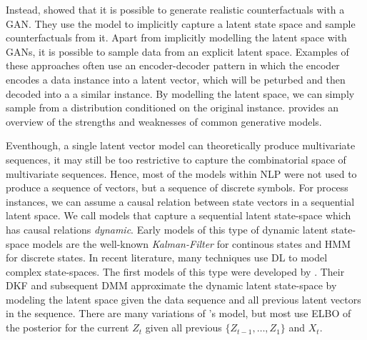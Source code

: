 \documentclass[./../../paper.tex]{subfiles}
\begin{document}
Instead, \citeauthor{robeer_GeneratingRealisticNatural_2021} showed that it is possible to generate realistic counterfactuals with a \gls{GAN}\autocite{robeer_GeneratingRealisticNatural_2021}. They use the model to implicitly capture a latent state space and sample counterfactuals from it. Apart from implicitly modelling the latent space with \glspl{GAN}, it is possible to sample data from an explicit latent space. Examples of these approaches often use an encoder-decoder pattern in which the encoder encodes a data instance into a latent vector, which will be peturbed and then decoded into a a similar instance\autocites{melnyk_ImprovedNeuralText_2017,wang_ControllableUnsupervisedText_2019}. By modelling the latent space, we can simply sample from a distribution conditioned on the original instance. \citeauthor{bond-taylor_DeepGenerativeModelling_2021} provides an overview of the strengths and weaknesses of common generative models.

Eventhough, a single latent vector model can theoretically produce multivariate sequences, it may still be too restrictive to capture the combinatorial space of multivariate sequences. Hence, most of the models within \gls{NLP} were not used to produce a sequence of vectors, but a sequence of discrete symbols. For process instances, we can assume a causal relation between state vectors in a sequential latent space. We call models that capture a sequential latent state-space which has causal relations \emph{dynamic}\autocite{leglaive_RecurrentVariationalAutoencoder_2020}. Early models of this type of dynamic latent state-space models are the well-known \emph{Kalman-Filter} for continous states and \gls{HMM} for discrete states. In recent literature, many techniques use \gls{DL} to model complex state-spaces. The first models of this type were developed by \citeauthor{krishnan_StructuredInferenceNetworks_2017}\autocite{krause_InteractingPredictionsVisual_2016, krishnan_StructuredInferenceNetworks_2017}. Their \gls{DKF} and subsequent \gls{DMM} approximate the dynamic latent state-space by modeling the latent space given the data sequence and all previous latent vectors in the sequence. There are many variations\autocites{chung_RecurrentLatentVariable_2016,fraccaro_SequentialNeuralModels_2016,leglaive_RecurrentVariationalAutoencoder_2020} of \citeauthor{krishnan_StructuredInferenceNetworks_2017}'s model, but most use \gls{ELBO} of the posterior for the current $Z_{t}$ given all previous $\{Z_{t-1},\ldots,Z_{1}\}$ and $X_{t}$\autocite{girin_DynamicalVariationalAutoencoders_2021a}.
\end{document}
